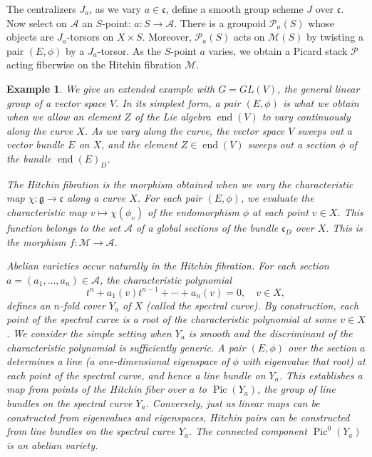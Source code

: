 \documentclass[brochure,english,12pt]{bourbaki}
\newtheorem{example}[equation]{Example}
\def\op#1{{\operatorname{#1}}}
\def\g{\mathfrak{g}}
\def\cc{\mathfrak{c}}
\def\A{{\mathcal A}}
\def\M{{\mathcal M}}
\def\P{{\mathcal P}}
\begin{document}
The centralizers $J_a$, as we vary $a\in \cc$, define a smooth group
scheme $J$ over $\cc$.  Now select on $\A$ an $S$-point: $a:S\to\A$.
There is a groupoid $\P_a(S)$ whose objects are $J_a$-torsors on
$X\times S$.  Moreover, $\P_a(S)$ acts on $\M(S)$ by twisting a pair
$(E,\phi)$ by a $J_a$-torsor.  As the $S$-point $a$ varies, we obtain
a Picard stack $\P$ acting fiberwise on the Hitchin fibration $\M$.  

\begin{example}  We give an extended example with $G=GL(V)$, the general linear group of
a vector space $V$.
In its simplest form, a pair $(E,\phi)$
is what we obtain when we allow an element $Z$ of the Lie
algebra $\op{end}(V)$ to vary continuously along the curve $X$.  
As we vary along the curve, the vector space $V$ sweeps out a vector
bundle $E$ on $X$, and the element $Z\in\op{end}(V)$ sweeps out a
section $\phi$ of the bundle 
$\op{end}(E)_D$.

The {\it Hitchin fibration} is the morphism obtained when we vary the
characteristic map $\chi:\g\to \cc$  along a
curve $X$.  For each pair $(E,\phi)$, we evaluate the
characteristic map $v\mapsto \chi(\phi_v)$ of the endomorphism $\phi$
at each point $v\in X$. This function belongs to the set $\A$ of a
global sections of the bundle $\cc_D$ over $X$.  This is the morphism
$f:{\M}\to {\A}$.

{\it Abelian varieties} occur naturally in the Hitchin
fibration.  For each section $a=(a_1,\ldots,a_n)\in
\A$,  the characteristic
polynomial 
\begin{equation}\label{eqn:spectral}
t^n + a_1(v) t^{n-1} + \cdots+ a_n(v)=0,\quad v\in X,
\end{equation} 
defines an $n$-fold cover $Y_a$ of $X$ (called the {\it spectral
  curve}).  By construction, each point of the spectral curve is a
root of the characteristic polynomial at some $v\in X$.  We consider
the simple setting when $Y_a$ is smooth and the discriminant of the
characteristic polynomial is sufficiently generic.  A pair $(E,\phi)$ over
the section $a$ determines a line (a one-dimensional eigenspace of
$\phi$ with eigenvalue that root) at each point of the spectral curve,
and hence a line bundle on $Y_a$.  This establishes a map from points of the Hitchin fiber
 over $a$ to $\op{Pic}(Y_a)$, the group of line bundles on the
spectral curve $Y_a$.  Conversely, just as linear maps can be
constructed from eigenvalues and eigenspaces, Hitchin pairs can be
constructed from line bundles on the spectral curve $Y_a$.  The
connected component $\op{Pic}^0(Y_a)$ is an abelian variety.
\end{example}
\end{document}
